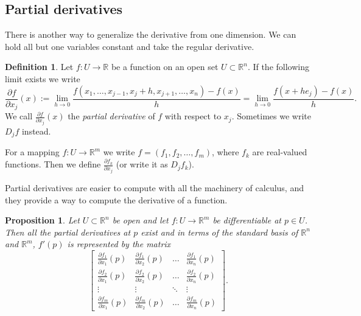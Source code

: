 \documentclass[12pt]{book}
\newcommand{\R}{{\mathbb{R}}}
\newcommand{\myindex}[1]{#1\index{#1}}
\theoremstyle{plain}
\newtheorem{prop}[thm]{Proposition}
\theoremstyle{remark}
\theoremstyle{definition}
\newtheorem{defn}[thm]{Definition}
\theoremstyle{exercise}
\theoremstyle{example}
\begin{document}
\subsection{Partial derivatives}

There is another way to generalize the derivative from one dimension.
We can hold all but one variables constant and take the regular
derivative.

\begin{defn}
Let
$f \colon U \to \R$ be a function on an open set $U \subset \R^n$.
If the following limit exists we write
\begin{equation*}
\frac{\partial f}{\partial x_j} (x) := 
\lim_{h\to 0}\frac{f(x_1,\ldots,x_{j-1},x_j+h,x_{j+1},\ldots,x_n)-f(x)}{h}
=
\lim_{h\to 0}\frac{f(x+h e_j)-f(x)}{h} .
\end{equation*}
We call 
$\frac{\partial f}{\partial x_j} (x)$ the \emph{\myindex{partial derivative}}
of $f$
with respect to $x_j$.  Sometimes we write $D_j f$ instead.

For a mapping $f \colon U \to \R^m$ we write
$f = (f_1,f_2,\ldots,f_m)$, where $f_k$ are real-valued
functions.  Then we define
$\frac{\partial f_k}{\partial x_j}$ (or write it as $D_j f_k$).
\end{defn}

Partial derivatives are easier to compute with all the machinery of
calculus, and they provide a way to compute the derivative of a
function.

\begin{prop}
Let $U \subset \R^n$ be open and let $f \colon U \to \R^m$ be
differentiable at $p \in U$.  Then all the partial derivatives at $p$
exist and in terms of the standard basis of $\R^n$ and $\R^m$,
$f'(p)$ is represented by the matrix
\begin{equation*}
\begin{bmatrix}
\frac{\partial f_1}{\partial x_1}(p)
&
\frac{\partial f_1}{\partial x_2}(p)
& \ldots &
\frac{\partial f_1}{\partial x_n}(p)
\\
\frac{\partial f_2}{\partial x_1}(p)
&
\frac{\partial f_2}{\partial x_2}(p)
& \ldots &
\frac{\partial f_2}{\partial x_n}(p)
\\
\vdots & \vdots & \ddots & \vdots
\\
\frac{\partial f_m}{\partial x_1}(p)
&
\frac{\partial f_m}{\partial x_2}(p)
& \ldots &
\frac{\partial f_m}{\partial x_n}(p)
\end{bmatrix} .
\end{equation*}
\end{prop}
\end{document}
